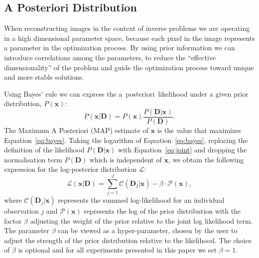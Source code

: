 \documentclass[twocolumn]{aastex631}
\newcommand{\aposteriori}{a~posteriori~}
\begin{document}
    \subsection{A Posteriori Distribution}
    When reconstructing images in the context of inverse problems we are operating in a high dimensional parameter space, because each pixel in the image represents a parameter in the optimization process. By using prior information we can introduce correlations among the parameters, to reduce the \enquote{effective dimensionality} of the problem and guide the optimization process toward unique and more stable solutions.
    
    Using Bayes' rule we can express the \aposteriori likelihood under a given prior distribution, $P(\mathbf{x} )$:
    \begin{equation}
        \label{eq:bayes}
        P(\mathbf{x}|\textbf{D}) = P(\mathbf{x} ) \frac{P(\textbf{D} |\mathbf{x})}{P(\textbf{D})}.
    \end{equation}
    The Maximum A Posteriori (MAP) estimate of $\mathbf{x}$ is the value that maximizes Equation~\ref{eq:bayes}.
    Taking the logarithm of Equation~\ref{eq:bayes}, replacing the definition of the likelihood $P(\mathbf{D}|\mathbf{x})$ with Equation~\ref{eq:joint} and dropping the normalisation term $P(\mathbf{D})$ which is independent of $\mathbf{x}$, we obtain the following expression for the log-posterior distribution
    $\mathcal{L}$:
    \begin{equation}
        \label{eq:total}
        \mathcal{L}\left(\mathbf{x} | \mathbf{D} \right) = \sum_{j=1}^J \mathcal{C}\left( \mathbf{D}_j | \mathbf{x} \right) - \beta \cdot \mathcal{P}(\mathbf{x}),
    \end{equation}
    where $\mathcal{C}\left( \mathbf{D}_j | \mathbf{x} \right)$ represents the summed log-likelihood for an individual observation $j$ and $\mathcal{P}(\mathbf{x})$ represents the log of the prior distribution with the factor $\beta$ adjusting the weight of the prior relative to the joint log likelihood term. The parameter $\beta$ can be viewed as a hyper-parameter, chosen by the user to adjust the strength of the prior distribution relative to the likelihood. The choice of $\beta$ is optional and for all experiments presented in this paper we set $\beta=1$. 

\end{document}
